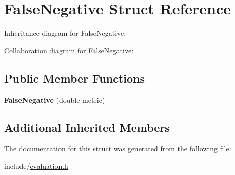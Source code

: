 \hypertarget{structFalseNegative}{}\section{False\+Negative Struct Reference}
\label{structFalseNegative}


Inheritance diagram for False\+Negative\+:


Collaboration diagram for False\+Negative\+:
\subsection*{Public Member Functions}
\begin{DoxyCompactItemize}
\item 
\mbox{\label{structFalseNegative_a1f6e5c168269e715124b8a26cca7c516}} 
{\bfseries False\+Negative} (double metric)
\end{DoxyCompactItemize}
\subsection*{Additional Inherited Members}


The documentation for this struct was generated from the following file\+:\begin{DoxyCompactItemize}
\item 
include/\hyperlink{evaluation_8h}{evaluation.\+h}\end{DoxyCompactItemize}
